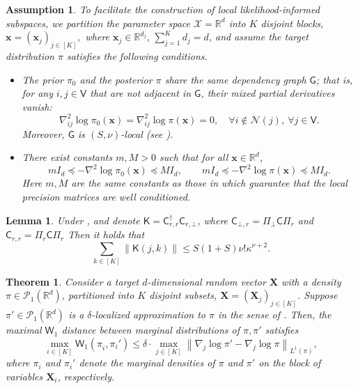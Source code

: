 \documentclass[10pt,a4paper]{amsart}
\newtheorem{thm}{Theorem}
\newtheorem{asm}{Assumption}
\newtheorem{lem}{Lemma}
\newcommand{\bX}{\boldsymbol{X}}
\newcommand{\bx}{{\boldsymbol{x}}}
\newcommand{\mR}{\mathbb{R}}
\newcommand{\mcN}{\mathcal{N}}
\newcommand{\mcP}{\mathcal{P}}
\newcommand{\mcX}{\mathcal{X}}
\newcommand{\norm}[1]{\left\|#1\right\|}
\newcommand{\sfC}{\mathsf{C}}
\newcommand{\sfG}{\mathsf{G}}
\newcommand{\sfK}{\mathsf{K}}
\newcommand{\sfV}{\mathsf{V}}
\newcommand{\sfW}{\mathsf{W}}
\begin{document}
\begin{asm}
\label{asm:LLIS}
To facilitate the construction of local likelihood-informed subspaces, we partition the parameter space $\mcX = \mR^d$ into $K$ disjoint blocks, $\bx = (\bx_j)_{j\in[K]},$ where $\bx_j \in \mR^{d_j},\, \sum_{j=1}^K d_j = d$,
and assume the target distribution $\pi$ satisfies the following conditions.
\begin{itemize}
    \item The prior $\pi_0$ and the posterior $\pi$ share the same dependency graph $\sfG$; that is, for any $i,j\in\sfV$ that are not adjacent in $\sfG$, their mixed partial derivatives vanish:
    \begin{equation}
        \nabla_{ij}^2 \log \pi_0 (\bx) = \nabla_{ij}^2 \log \pi (\bx) = 0, \quad \forall i \notin \mcN(j),~ \forall j \in \sfV.
    \end{equation}
    Moreover, $\sfG$ is $(S,\nu)$-local (see ).
    \item There exist constants $m,M > 0$ such that for all $\bx \in \mR^d$,
    \begin{equation}
        m I_d \preceq - \nabla^2 \log \pi_0(\bx) \preceq M I_d, \qquad m I_d \preceq - \nabla^2 \log \pi(\bx) \preceq M I_d.
    \end{equation}
    Here $m,M$ are the same constants as those in  which guarantee that the local precision matrices are well conditioned.
\end{itemize}
\end{asm}

\begin{lem}
\label{lem:Kl1Bound}
Under , and denote $\sfK = \sfC_{r,r}^\dag \sfC_{r,\bot}$, where $\sfC_{\bot,r} = \Pi_{\bot} \sfC \Pi_{r}$ and $\sfC_{r,r} = \Pi_{r} \sfC \Pi_{r}$
Then it holds that 
\[
    \sum_{k\in[K]} \norm{ \sfK(j,k) } \le S(1+S) \nu! \kappa^{\nu+2}. 
\]
\end{lem}

\begin{thm}
\label{thm:margin}
Consider a target $d$-dimensional random vector $\bX$ with a density $\pi \in \mcP_1(\mR^d)$, partitioned into $K$ disjoint subsets, $\bX = (\bX_j)_{j \in [K]}$.
%
Suppose $\pi'\in \mcP_1(\mR^d)$ is a $\delta$-localized approximation to $\pi$ in the sense of .
Then, the maximal $\sfW_1$ distance between marginal distributions of $\pi,\pi'$ satisfies
\begin{equation}
\label{eqn:MarginIneqn}
    \max_{i\in [K]} \sfW_1 (\pi_i^{}, \pi_i') \le \delta \cdot \max_{j\in [K]} \norm{ \nabla_j \log \pi' - \nabla_j \log \pi }_{L^1(\pi)},
\end{equation}
where $\pi_i$ and $\pi_i'$ denote the marginal densities of $\pi$ and $\pi'$ on the block of variables $\bX_i$, respectively. 
\end{thm}
\end{document}
